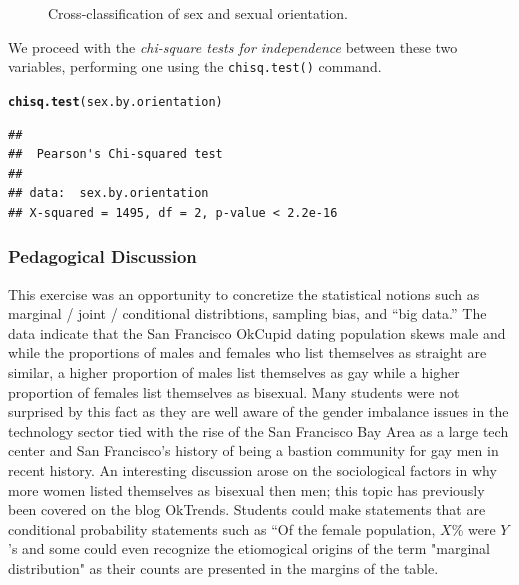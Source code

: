 \documentclass{article}\usepackage[]{graphicx}\usepackage[]{color}
\makeatletter
\newcommand{\hlstd}[1]{\textcolor[rgb]{0.345,0.345,0.345}{#1}}%
\newcommand{\hlkwd}[1]{\textcolor[rgb]{0.737,0.353,0.396}{\textbf{#1}}}%
\newenvironment{kframe}{%
 \def\at@end@of@kframe{}%
 \ifinner\ifhmode%
  \def\at@end@of@kframe{\end{minipage}}%
  \begin{minipage}{\columnwidth}%
 \fi\fi%
 \def\FrameCommand##1{\hskip\@totalleftmargin \hskip-\fboxsep
 \colorbox{shadecolor}{##1}\hskip-\fboxsep
     \hskip-\linewidth \hskip-\@totalleftmargin \hskip\columnwidth}%
 \MakeFramed {\advance\hsize-\width
   \@totalleftmargin\z@ \linewidth\hsize
   \@setminipage}}%
 {\par\unskip\endMakeFramed%
 \at@end@of@kframe}
\newenvironment{knitrout}{}{} %
\makeatother
\begin{document}
\begin{knitrout}
\begin{figure}
{}

\caption[Cross-classification of sex and sexual orientation]{Cross-classification of sex and sexual orientation.}\label{fig:sex_by_orientation}
\end{figure}


\end{knitrout}

We proceed with the \textit{chi-square tests for independence} between these two variables, performing one using the \verb#chisq.test()# command.
\begin{knitrout}
\color{fgcolor}\begin{kframe}
\begin{alltt}
\hlkwd{chisq.test}\hlstd{(sex.by.orientation)}
\end{alltt}
\begin{verbatim}
## 
## 	Pearson's Chi-squared test
## 
## data:  sex.by.orientation
## X-squared = 1495, df = 2, p-value < 2.2e-16
\end{verbatim}
\end{kframe}
\end{knitrout}



\subsubsection{Pedagogical Discussion}
This exercise was an opportunity to concretize the statistical notions such as marginal / joint / conditional distribtions, sampling bias, and ``big data.''  The data indicate that the San Francisco OkCupid dating population skews male and while the proportions of males and females who list themselves as straight are similar, a higher proportion of males list themselves as gay while a higher proportion of females list themselves as bisexual.  Many students were not surprised by this fact as they are well aware of the gender imbalance issues in the technology sector tied with the rise of the San Francisco Bay Area as a large tech center and San Francisco's history of being a bastion community for gay men in recent history.  An interesting discussion arose on the sociological factors in why more women listed themselves as bisexual then men; this topic has previously been covered on the blog OkTrends\cite{OkTrendsLies}.  Students could make statements that are conditional probability statements such as ``Of the female population, $X$\% were $Y$'s and some could even recognize the etiomogical origins of the term "marginal distribution" as their counts are presented in the margins of the table.
\end{document}
